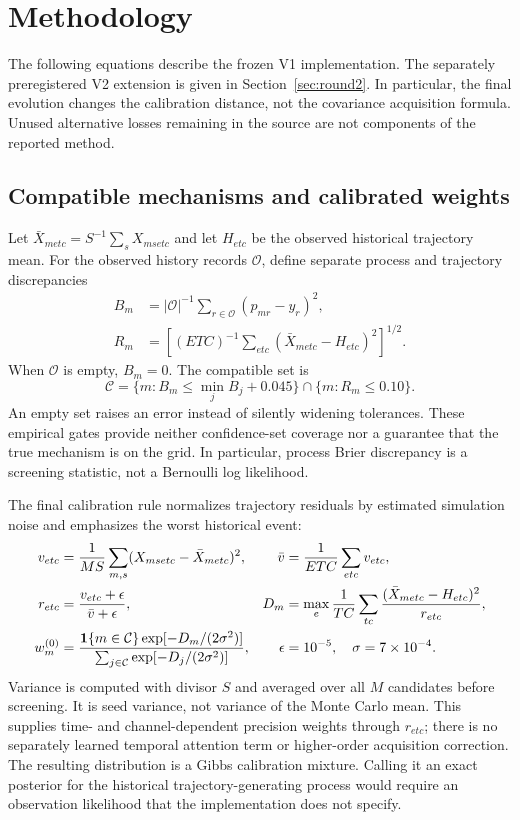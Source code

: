 \section{Methodology}
\label{sec:method}
The following equations describe the frozen V1 implementation. The separately preregistered V2 extension is given in Section~\ref{sec:round2}. In particular, the final evolution changes the calibration distance, not the covariance acquisition formula. Unused alternative losses remaining in the source are not components of the reported method.

\subsection{Compatible mechanisms and calibrated weights}
Let $\bar X_{metc}=S^{-1}\sum_sX_{msetc}$ and let $H_{etc}$ be the observed historical trajectory mean. For the observed history records $\mathcal O$, define separate process and trajectory discrepancies
\begin{align}
 B_m&=|\mathcal O|^{-1}\sum_{r\in\mathcal O}(p_{mr}-y_r)^2,\nonumber\\
 R_m&=\left[(ETC)^{-1}\sum_{etc}(\bar X_{metc}-H_{etc})^2\right]^{1/2}.
 \label{eq:compaterrors}
\end{align}
When $\mathcal O$ is empty, $B_m=0$. The compatible set is
\begin{equation}
 \mathcal C=\{m:B_m\leq\min_j B_j+0.045\}\cap\{m:R_m\leq0.10\}.
 \label{eq:set}
\end{equation}
An empty set raises an error instead of silently widening tolerances. These empirical gates provide neither confidence-set coverage nor a guarantee that the true mechanism is on the grid. In particular, process Brier discrepancy is a screening statistic, not a Bernoulli log likelihood.

The final calibration rule normalizes trajectory residuals by estimated simulation noise and emphasizes the worst historical event:
\begin{align}
 v_{etc}&=\frac1{MS}\sum_{m,s}(X_{msetc}-\bar X_{metc})^2,
 &\bar v&=\frac1{ETC}\sum_{etc}v_{etc},\nonumber\\
 r_{etc}&=\frac{v_{etc}+\epsilon}{\bar v+\epsilon},
 &D_m&=\max_e\frac1{TC}\sum_{tc}\frac{(\bar X_{metc}-H_{etc})^2}{r_{etc}},\label{eq:distance}\\
 w_m^{(0)}&=\frac{\mathbf{1}\{m\in\mathcal C\}\exp[-D_m/(2\sigma^2)]}
 {\sum_{j\in\mathcal C}\exp[-D_j/(2\sigma^2)]},
 &\epsilon&=10^{-5},\quad\sigma=7\times10^{-4}.\label{eq:weights}
\end{align}
Variance is computed with divisor $S$ and averaged over all $M$ candidates before screening. It is seed variance, not variance of the Monte Carlo mean. This supplies time- and channel-dependent precision weights through $r_{etc}$; there is no separately learned temporal attention term or higher-order acquisition correction. The resulting distribution is a Gibbs calibration mixture. Calling it an exact posterior for the historical trajectory-generating process would require an observation likelihood that the implementation does not specify.

